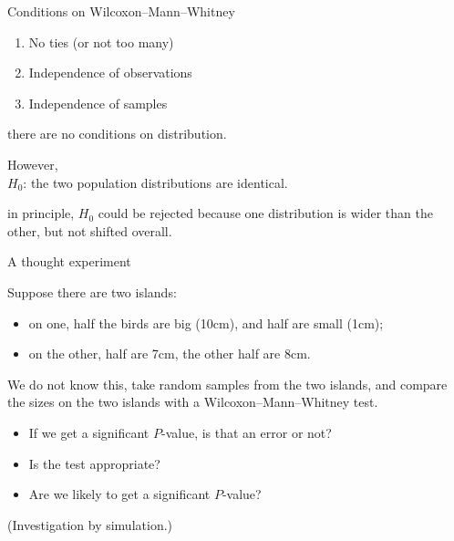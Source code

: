 \begin{frame}{Conditions on Wilcoxon--Mann--Whitney}

  \begin{enumerate}
    \item No ties (or not too many)
    \item Independence of observations
    \item Independence of samples
  \end{enumerate}

    \vspace{2em}

     there are no conditions on distribution.

    \vspace{2em}
   \alert{However,}\\
    $H_0$: the two population distributions are identical.


    \vspace{2em}

     in principle, $H_0$ could be rejected because one distribution is wider than the other, but not shifted overall.

\end{frame}


\begin{frame}{A thought experiment}

  Suppose there are two islands: 
  \begin{itemize}
    \item on one, half the birds are big (10cm), and half are small (1cm);
    \item on the other, half are 7cm, the other half are 8cm.
  \end{itemize}

  \vspace{2em}

  We do not know this, take random samples from the two islands,
  and compare the sizes on the two islands with a Wilcoxon--Mann--Whitney test.
  \begin{itemize}
    \item If we get a significant $P$-value, is that an error or not?
    \item Is the test appropriate?
    \item Are we likely to get a significant $P$-value?
  \end{itemize}

  \vspace{2em}
  \pause

  (Investigation by simulation.)

\end{frame}

